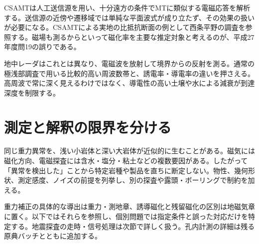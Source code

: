 CSAMTは人工送信源を用い、十分遠方の条件でMTに類似する電磁応答を解析する。送信源の近傍や遷移域では単純な平面波式が成り立たず、その効果の扱いが必要になる。CSAMTによる実地の比抵抗断面の例として西条平野の調査を参照する\cite{ochi_csamt_saijo}。磁場も測るからといって磁化率を主要な推定対象と考えるのが、平成27年度問19の誤りである。

地中レーダはこれとは異なり、電磁波を放射して境界からの反射を測る。通常の極浅部調査で用いる比較的高い周波数帯と、誘電率・導電率の違いを押さえる。高周波で常に深く見えるわけではなく、導電性の高い土壌や水による減衰が到達深度を制限する。

\section{測定と解釈の限界を分ける}
同じ重力異常を、浅い小岩体と深い大岩体が近似的に生むことがある。磁気には磁化方向、電磁探査には含水・塩分・粘土などの複数要因がある。したがって「異常を検出した」ことから特定岩種や製品を直ちに断定しない。物性、幾何形状、測定感度、ノイズの前提を列挙し、別の探査や露頭・ボーリングで制約を加える。

重力補正の具体的な導出は重力・測地章、誘導磁化と残留磁化の区別は地磁気章に置く。以下ではそれらを参照し、個別問題では指定条件と誤った対応だけを特定する。地震探査の走時・信号処理は次節で詳しく扱う。孔内計測の詳細は残る原典バッチとともに追加する。




